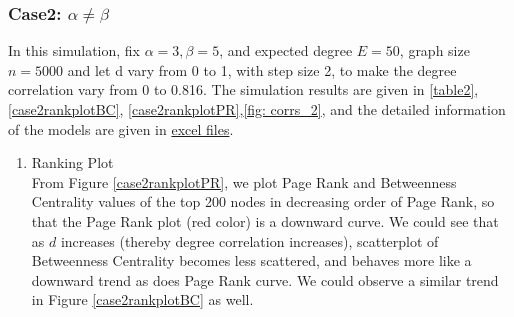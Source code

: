 \documentclass{article}
\begin{document}
\subsubsection{Case2: $\alpha \neq \beta$}
\par In this simulation, fix $\alpha=3, \beta=5$, and expected degree $E = 50$, graph size $ n=5000$ and let d vary from 0 to 1, with step size 2,  to make the degree correlation vary from 0 to 0.816. The simulation results are given in \ref{table2}, \ref{case2rankplotBC}, \ref{case2rankplotPR},\ref{fig: corrs_2}, and the detailed information of the models are given in \href{https://github.com/leahwu/DCM_simulaiton_and_analysis/tree/master/output_data/part2_case2}{excel files}.

\begin{enumerate}
\item Ranking Plot \\
From Figure \ref{case2rankplotPR}, we plot Page Rank and Betweenness Centrality values of the top 200 nodes in decreasing order of Page Rank, so that the Page Rank plot (red color) is a downward curve. We could see that as $d$ increases (thereby degree correlation increases), scatterplot of Betweenness Centrality  becomes less scattered, and behaves more like a downward trend as does Page Rank curve. We could observe a similar trend in Figure \ref{case2rankplotBC} as well.\\


\end{enumerate}
\end{document}
